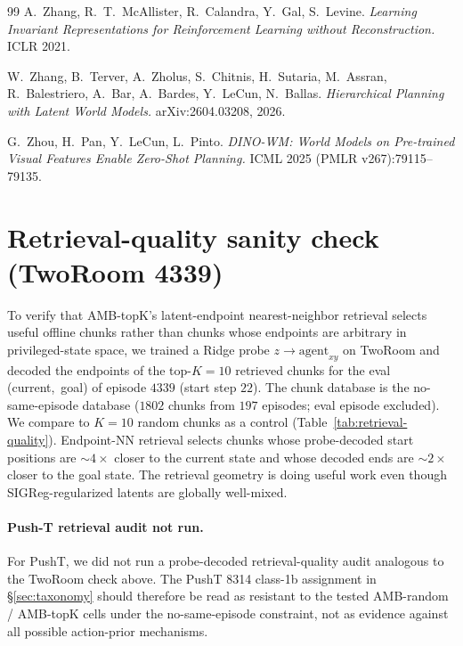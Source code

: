 \documentclass{article}
\begin{document}
\begin{thebibliography}{99}
A.~Zhang, R.~T.~McAllister, R.~Calandra, Y.~Gal, S.~Levine.
\emph{Learning Invariant Representations for Reinforcement Learning without Reconstruction.}
ICLR 2021.

W.~Zhang, B.~Terver, A.~Zholus, S.~Chitnis, H.~Sutaria, M.~Assran, R.~Balestriero, A.~Bar, A.~Bardes, Y.~LeCun, N.~Ballas.
\emph{Hierarchical Planning with Latent World Models.}
arXiv:2604.03208, 2026.

G.~Zhou, H.~Pan, Y.~LeCun, L.~Pinto.
\emph{DINO-WM: World Models on Pre-trained Visual Features Enable Zero-Shot Planning.}
ICML 2025 (PMLR v267):79115--79135.

\end{thebibliography}

\appendix

\section{Retrieval-quality sanity check (TwoRoom 4339)}
\label{app:retrieval-quality}

To verify that AMB-topK's latent-endpoint nearest-neighbor retrieval selects useful offline chunks rather than chunks whose endpoints are arbitrary in privileged-state space, we trained a Ridge probe $z \to \text{agent}_{xy}$ on TwoRoom and decoded the endpoints of the top-$K{=}10$ retrieved chunks for the eval (current,~goal) of episode $4339$ (start step $22$). The chunk database is the no-same-episode database ($1802$ chunks from $197$ episodes; eval episode excluded). We compare to $K{=}10$ random chunks as a control (Table~\ref{tab:retrieval-quality}). Endpoint-NN retrieval selects chunks whose probe-decoded start positions are $\sim 4\times$ closer to the current state and whose decoded ends are $\sim 2\times$ closer to the goal state. The retrieval geometry is doing useful work even though SIGReg-regularized latents are globally well-mixed.

\paragraph{Push-T retrieval audit not run.} For PushT, we did not run a probe-decoded retrieval-quality audit analogous to the TwoRoom check above. The PushT 8314 class-1b assignment in \S\ref{sec:taxonomy} should therefore be read as resistant to the tested AMB-random / AMB-topK cells under the no-same-episode constraint, not as evidence against all possible action-prior mechanisms.
\end{document}
